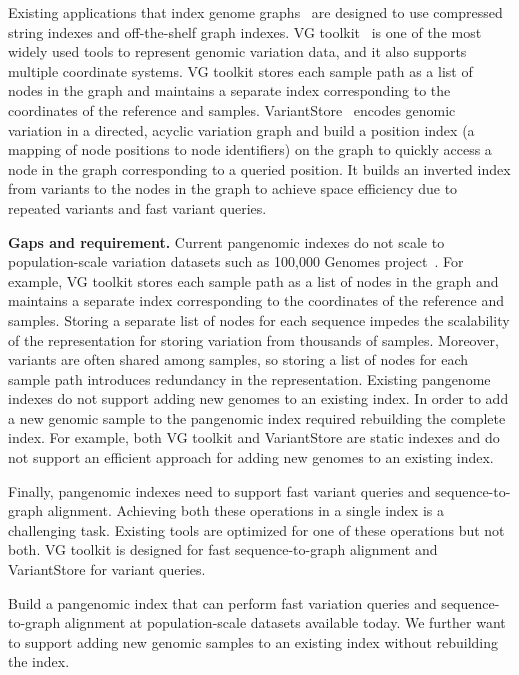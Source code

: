 Existing applications that index genome graphs~\cite{pandey2021variantstore,garrison2018variation} are designed to use compressed string indexes and off-the-shelf graph indexes. VG toolkit~\cite{garrison2018variation} is one of the most widely used tools to represent genomic variation data, and it also supports multiple coordinate systems. VG toolkit stores each sample path as a list of nodes in the graph and maintains a separate index corresponding to the coordinates of the reference and samples.
%
VariantStore~\cite{pandey2021variantstore}  encodes genomic variation in a directed, acyclic variation graph and build a position index (a mapping of node positions to node identifiers) on the graph to quickly access a node in the graph corresponding to a queried position. It builds an inverted index from variants to the nodes in the graph to achieve space efficiency due to repeated variants and fast variant queries.

\noindent
\textbf{Gaps and requirement.}
Current pangenomic indexes do not scale to population-scale variation datasets such as 100,000 Genomes project~\cite{1002021100}. For example, VG toolkit stores each sample path as a list of nodes in the graph and maintains a separate index corresponding to the coordinates of the reference and samples. Storing a separate list of nodes for each sequence impedes the scalability of the representation for storing variation from thousands of samples. Moreover, variants are often shared among samples, so storing a list of nodes for each sample path introduces redundancy in the representation.
%
Existing pangenome indexes do not support adding new genomes to an existing index. In order to add a new genomic sample to the pangenomic index required rebuilding the complete index. For example, both VG toolkit and VariantStore are static indexes and do not support an efficient approach for adding new genomes to an existing index.

Finally, pangenomic indexes need to support fast variant queries and sequence-to-graph alignment. Achieving both these operations in a single index is a challenging task. Existing tools are optimized for one of these operations but not both. VG toolkit is designed for fast sequence-to-graph alignment and VariantStore for variant queries.


\begin{rproblem}
 Build a pangenomic index that can perform fast variation queries and sequence-to-graph alignment at population-scale datasets available today. We further want to support adding new genomic samples to an existing index without rebuilding the index.
\label{rprob:pangenomics}
\end{rproblem}


